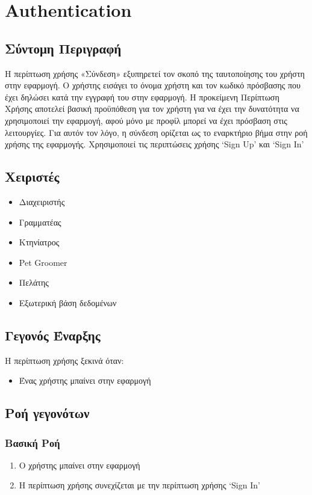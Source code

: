 \documentclass[12pt,a4paper,twoside]{book}
\begin{document}
\section{Authentication}

\subsection{Σύντομη Περιγραφή}
Η περίπτωση χρήσης «Σύνδεση» εξυπηρετεί τον σκοπό της ταυτοποίησης του χρήστη στην εφαρμογή. Ο χρήστης εισάγει το όνομα χρήστη και τον κωδικό πρόσβασης που έχει δηλώσει κατά την εγγραφή του στην εφαρμογή. Η προκείμενη Περίπτωση Χρήσης αποτελεί βασική προϋπόθεση για τον χρήστη για να έχει την δυνατότητα να χρησιμοποιεί την εφαρμογή, αφού μόνο με προφίλ μπορεί να έχει πρόσβαση στις λειτουργίες. Για αυτόν τον λόγο, η σύνδεση ορίζεται ως το εναρκτήριο βήμα στην ροή χρήσης της εφαρμογής. Χρησιμοποιεί τις περιπτώσεις χρήσης `Sign Up' και `Sign In' %

\subsection{Χειριστές}
\begin{itemize}
  \item Διαχειριστής
  \item Γραμματέας
  \item Κτηνίατρος
  \item Pet Groomer
  \item Πελάτης
  \item Εξωτερική βάση δεδομένων %
\end{itemize}

\subsection{Γεγονός Έναρξης}
Η περίπτωση χρήσης ξεκινά όταν:
\begin{itemize}
  \item Ένας χρήστης μπαίνει στην εφαρμογή
\end{itemize}

\subsection{Ροή γεγονότων}

\subsubsection{Βασική Ροή}
\begin{enumerate}
  \item Ο χρήστης μπαίνει στην εφαρμογή
  \item Η περίπτωση χρήσης συνεχίζεται με την περίπτωση χρήσης `Sign In' %
\end{enumerate}
\end{document}
